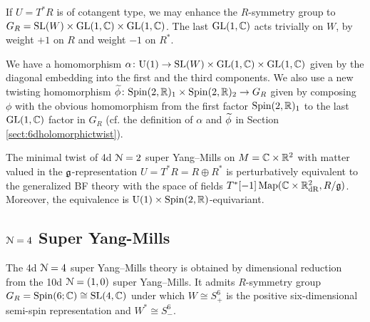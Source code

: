 \documentclass[10pt, oneside]{article}
\renewcommand{\U}{\mathrm{U}}
\begin{document}
If $U = T^* R$ is of cotangent type, we may enhance the $R$-symmetry group to $G_R=\mathrm{SL}(W)\times \mathrm{GL}(1, \mathbb C)\times \mathrm{GL}(1, \mathbb C)$. The last $\mathrm{GL}(1, \mathbb C)$ acts trivially on $W$, by weight $+1$ on $R$ and weight $-1$ on $R^*$.

We have a homomorphism $\alpha\colon \U(1)\rightarrow  \SL(W)\times \GL(1, \CC) \times \GL(1, \CC)$ given by the diagonal embedding into the first and the third components. We also use a new twisting homomorphism $\widetilde{\phi}\colon \mathrm{Spin}(2, \mathbb R)_1 \times \mathrm{Spin}(2, \mathbb R)_2\rightarrow G_R$ given by composing $\phi$ with the obvious homomorphism from the first factor $\mathrm{Spin}(2, \mathbb R)_1$ to the last $\mathrm{GL}(1, \mathbb C)$ factor in $G_R$ (cf. the definition of $\alpha$ and $\widetilde{\phi}$ in Section \ref{sect:6dholomorphictwist}).

\begin{theorem}\label{thm:4d_11_twistgraded}
The minimal twist of 4d $\mathcal N=2$ super Yang--Mills on $M=\mathbb C \times \mathbb R^2$ with matter valued in the $\mathfrak g$-representation $U=T^* R=R\oplus R^*$ is perturbatively equivalent to the generalized BF theory with the space of fields $T^*[-1]\operatorname{Map}(\mathbb C \times \mathbb R^2_{\mathrm{dR}}, R/\mathfrak g)$. Moreover, the equivalence is $\U(1)\times \Spin(2, \RR)$-equivariant.
\end{theorem}

\subsection{\texorpdfstring{$\mathcal N=4$}{N=4} Super Yang-Mills} \label{4d_4_section}

The 4d $\mathcal N=4$ super Yang--Mills theory is obtained by dimensional reduction from the 10d $\mathcal N=(1, 0)$ super Yang--Mills. It admits $R$-symmetry group $G_R=\mathrm{Spin}(6; \mathbb C)\cong \mathrm{SL}(4, \mathbb C)$ under which $W \cong S_+^6$ is the positive six-dimensional semi-spin representation and $W^* \cong S_-^6$. 
\end{document}

